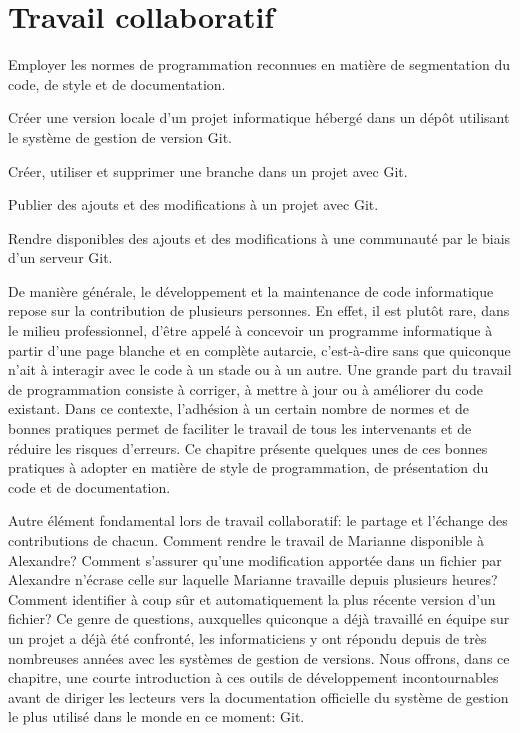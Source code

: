
\chapter{Travail collaboratif}
\label{chap:collaboration}

\begin{objectifs}
\item Employer les normes de programmation reconnues en matière de
  segmentation du code, de style et de documentation.
\item Créer une version locale d'un projet informatique hébergé dans
  un dépôt utilisant le système de gestion de version Git.
\item Créer, utiliser et supprimer une branche dans un projet avec
  Git.
\item Publier des ajouts et des modifications à un projet avec Git.
\item Rendre disponibles des ajouts et des modifications à une
  communauté par le biais d'un serveur Git.
\end{objectifs}

De manière générale, le développement et la maintenance de code
informatique repose sur la contribution de plusieurs personnes. En
effet, il est plutôt rare, dans le milieu professionnel, d'être appelé
à concevoir un programme informatique à partir d'une page blanche et
en complète autarcie, c'est-à-dire sans que quiconque n'ait à
interagir avec le code à un stade ou à un autre. Une grande part du
travail de programmation consiste à corriger, à mettre à jour ou à
améliorer du code existant. Dans ce contexte, l'adhésion à un certain
nombre de normes et de bonnes pratiques permet de faciliter le travail
de tous les intervenants et de réduire les risques d'erreurs. Ce
chapitre présente quelques unes de ces bonnes pratiques à adopter en
matière de style de programmation, de présentation du code et de
documentation.

Autre élément fondamental lors de travail collaboratif: le partage et
l'échange des contributions de chacun. Comment rendre le travail de
Marianne disponible à Alexandre? Comment s'assurer qu'une modification
apportée dans un fichier par Alexandre n'écrase celle sur laquelle
Marianne travaille depuis plusieurs heures? Comment identifier à coup
sûr et automatiquement la plus récente version d'un fichier? Ce genre
de questions, auxquelles quiconque a déjà travaillé en équipe sur un
projet a déjà été confronté, les informaticiens y ont répondu depuis
de très nombreuses années avec les systèmes de gestion de versions.
Nous offrons, dans ce chapitre, une courte introduction à ces outils
de développement incontournables avant de diriger les lecteurs vers la
documentation officielle du système de gestion le plus utilisé dans le
monde en ce moment: Git.



